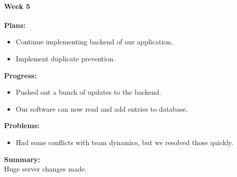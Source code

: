 \paragraph{Week 5}
\begin{adjustwidth}{2.5em}{0pt}
    \vspace{-0.5cm}\textbf{Plans:}
    \vspace{-0.5cm}
    \begin{itemize}
        \item Continue implementing backend of our application.
		\item Implement duplicate prevention.
    \end{itemize} 
    \vspace{-0.3cm}\textbf{Progress:}
    \vspace{-0.5cm}
    \begin{itemize}
        \item Pushed out a bunch of updates to the backend. 
		\item Our software can now read and add entries to database. 
    \end{itemize} 
    \vspace{-0.3cm}\textbf{Problems:}
    \vspace{-0.5cm}
    \begin{itemize}
        \item Had some conflicts with team dynamics, but we resolved those quickly.
    \end{itemize}  
    \vspace{-0.3cm}\noindent\textbf{Summary:}\\
    \noindent Huge server changes made.
\end{adjustwidth} 
